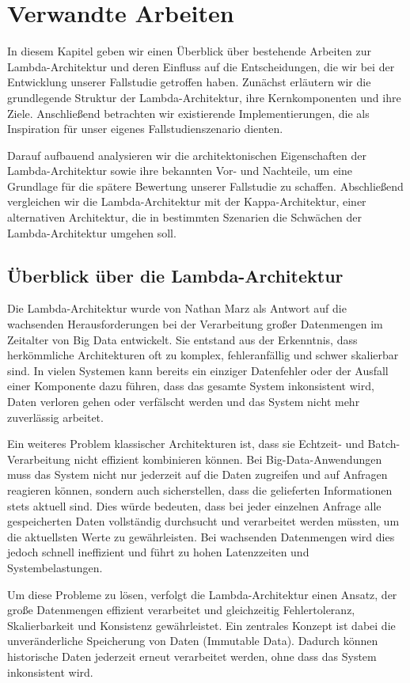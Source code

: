 \chapter{Verwandte Arbeiten}
In diesem Kapitel geben wir einen Überblick über bestehende Arbeiten zur Lambda-Architektur und deren Einfluss auf die Entscheidungen, die wir bei der Entwicklung unserer Fallstudie getroffen haben. Zunächst erläutern wir die grundlegende Struktur der Lambda-Architektur, ihre Kernkomponenten und ihre Ziele. Anschließend betrachten wir existierende Implementierungen, die als Inspiration für unser eigenes Fallstudienszenario dienten.

Darauf aufbauend analysieren wir die architektonischen Eigenschaften der Lambda-Architektur sowie ihre bekannten Vor- und Nachteile, um eine Grundlage für die spätere Bewertung unserer Fallstudie zu schaffen. Abschließend vergleichen wir die Lambda-Architektur mit der Kappa-Architektur, einer alternativen Architektur, die in bestimmten Szenarien die Schwächen der Lambda-Architektur umgehen soll.

\section{Überblick über die Lambda-Architektur}
Die Lambda-Architektur wurde von Nathan Marz als Antwort auf die wachsenden Herausforderungen bei der Verarbeitung großer Datenmengen im Zeitalter von Big Data entwickelt. Sie entstand aus der Erkenntnis, dass herkömmliche Architekturen oft zu komplex, fehleranfällig und schwer skalierbar sind. In vielen Systemen kann bereits ein einziger Datenfehler oder der Ausfall einer Komponente dazu führen, dass das gesamte System inkonsistent wird, Daten verloren gehen oder verfälscht werden und das System nicht mehr zuverlässig arbeitet.

Ein weiteres Problem klassischer Architekturen ist, dass sie Echtzeit- und Batch-Verarbeitung nicht effizient kombinieren können. Bei Big-Data-Anwendungen muss das System nicht nur jederzeit auf die Daten zugreifen und auf Anfragen reagieren können, sondern auch sicherstellen, dass die gelieferten Informationen stets aktuell sind. Dies würde bedeuten, dass bei jeder einzelnen Anfrage alle gespeicherten Daten vollständig durchsucht und verarbeitet werden müssten, um die aktuellsten Werte zu gewährleisten. Bei wachsenden Datenmengen wird dies jedoch schnell ineffizient und führt zu hohen Latenzzeiten und Systembelastungen.

Um diese Probleme zu lösen, verfolgt die Lambda-Architektur einen Ansatz, der große Datenmengen effizient verarbeitet und gleichzeitig Fehlertoleranz, Skalierbarkeit und Konsistenz gewährleistet. Ein zentrales Konzept ist dabei die unveränderliche Speicherung von Daten (Immutable Data). Dadurch können historische Daten jederzeit erneut verarbeitet werden, ohne dass das System inkonsistent wird.

